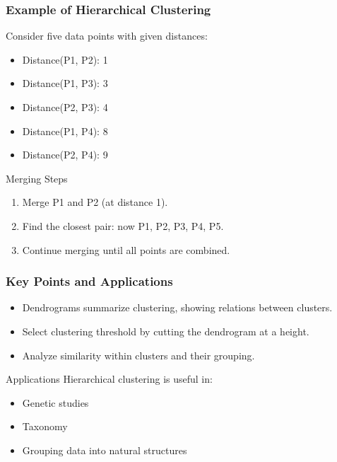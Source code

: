 \documentclass[aspectratio=169]{beamer}
\begin{document}
\begin{frame}[fragile]
    \frametitle{Example of Hierarchical Clustering}
    Consider five data points with given distances:
    \begin{itemize}
        \item Distance(P1, P2): 1
        \item Distance(P1, P3): 3
        \item Distance(P2, P3): 4
        \item Distance(P1, P4): 8
        \item Distance(P2, P4): 9
    \end{itemize}
    \begin{block}{Merging Steps}
        \begin{enumerate}
            \item Merge P1 and P2 (at distance 1).
            \item Find the closest pair: now {P1, P2}, P3, P4, P5.
            \item Continue merging until all points are combined.
        \end{enumerate}
    \end{block}
\end{frame}

\begin{frame}[fragile]
    \frametitle{Key Points and Applications}
    \begin{itemize}
        \item Dendrograms summarize clustering, showing relations between clusters.
        \item Select clustering threshold by cutting the dendrogram at a height.
        \item Analyze similarity within clusters and their grouping.
    \end{itemize}
    
    \begin{block}{Applications}
        Hierarchical clustering is useful in:
        \begin{itemize}
            \item Genetic studies
            \item Taxonomy
            \item Grouping data into natural structures
        \end{itemize}
    \end{block}
\end{frame}
\end{document}
